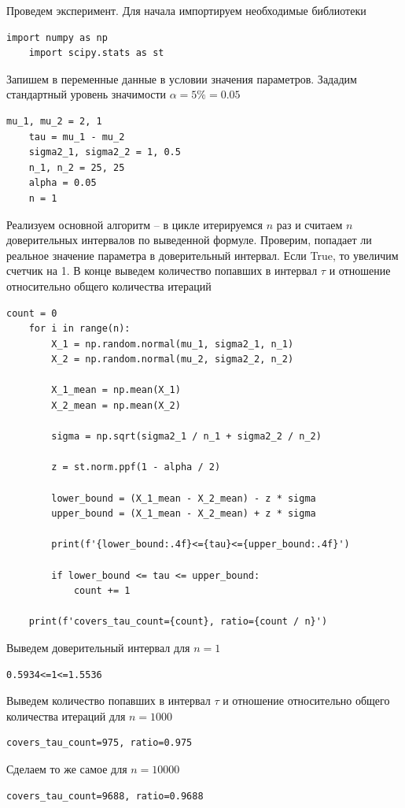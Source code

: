 \documentclass[a4paper, 12pt]{article}
\begin{document}
    Проведем эксперимент. Для начала импортируем необходимые библиотеки
    \begin{lstlisting}[label=imps1, caption={Импортирование необходимых библиотек}]
    import numpy as np
    import scipy.stats as st
    \end{lstlisting}
    Запишем в переменные данные в условии значения параметров. Зададим стандартный уровень значимости $\alpha=5\%=0.05$
    \begin{lstlisting}[label=vars, caption={Задаем данные по условию}]
    mu_1, mu_2 = 2, 1
    tau = mu_1 - mu_2
    sigma2_1, sigma2_2 = 1, 0.5
    n_1, n_2 = 25, 25
    alpha = 0.05
    n = 1
    \end{lstlisting}
    Реализуем основной алгоритм -- в цикле итерируемся $n$ раз и считаем $n$ доверительных интервалов по выведенной формуле.
    Проверим, попадает ли реальное значение параметра в доверительный интервал. Если True, то увеличим счетчик на 1. В конце
    выведем количество попавших в интервал $\tau$ и отношение относительно общего количества итераций
    \begin{lstlisting}[label=code1, caption={Код для подсчета доверительных интервалов и кол-ва попаданий}]
    count = 0
    for i in range(n):
        X_1 = np.random.normal(mu_1, sigma2_1, n_1)
        X_2 = np.random.normal(mu_2, sigma2_2, n_2)
        
        X_1_mean = np.mean(X_1)
        X_2_mean = np.mean(X_2)
        
        sigma = np.sqrt(sigma2_1 / n_1 + sigma2_2 / n_2)
        
        z = st.norm.ppf(1 - alpha / 2)
        
        lower_bound = (X_1_mean - X_2_mean) - z * sigma
        upper_bound = (X_1_mean - X_2_mean) + z * sigma

        print(f'{lower_bound:.4f}<={tau}<={upper_bound:.4f}')
            
        if lower_bound <= tau <= upper_bound:
            count += 1
        
    print(f'covers_tau_count={count}, ratio={count / n}')
    \end{lstlisting}


    Выведем доверительный интервал для $n=1$
    \begin{lstlisting}[label=res1, caption={Посчитанный доверительный интервал}]
    0.5934<=1<=1.5536
    \end{lstlisting}
    Выведем количество попавших в интервал $\tau$ и отношение относительно общего количества итераций
    для $n=1000$
    \begin{lstlisting}[label=res1000cov, caption={95-\% доверительный интервал для $n=1000$}]
    covers_tau_count=975, ratio=0.975
    \end{lstlisting}
    Сделаем то же самое для $n=10000$
    \begin{lstlisting}[label=res10000cov, caption={95-\% доверительный интервал для $n=10000$}]
    covers_tau_count=9688, ratio=0.9688
    \end{lstlisting}
\end{document}
